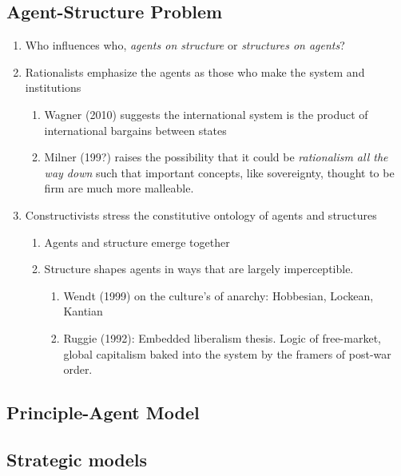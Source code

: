\documentclass[11pt]{article}
\begin{document}
\subsection{Agent-Structure Problem}
\label{sec-1-2}
\begin{enumerate}
\item Who influences who, \emph{agents on structure} or \emph{structures on agents}?
\item Rationalists emphasize the agents as those who make the system and institutions
\begin{enumerate}
\item Wagner (2010) suggests the international system is the product
of international bargains between states
\item Milner (199?) raises the possibility that it could be
\emph{rationalism all the way down} such that important concepts,
like sovereignty, thought to be firm are much more malleable.
\end{enumerate}
\item Constructivists stress the constitutive ontology of agents and structures
\begin{enumerate}
\item Agents and structure emerge together
\item Structure shapes agents in ways that are largely imperceptible.
\begin{enumerate}
\item Wendt (1999) on the culture's of anarchy: Hobbesian, Lockean, Kantian
\item Ruggie (1992): Embedded liberalism thesis. Logic of
free-market, global capitalism baked into the system by the
framers of post-war order.
\end{enumerate}
\end{enumerate}
\end{enumerate}
\subsection{Principle-Agent Model}
\label{sec-1-3}
\subsection{Strategic models}
\label{sec-1-4}
\end{document}
